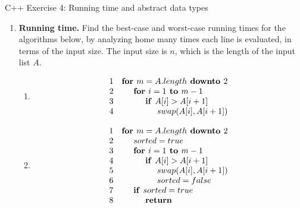 \documentclass[a4paper,12pt]{article}
\begin{document}
\thispagestyle{empty}

\begin{center}
\Large C++ Exercise 4: Running time and abstract data types 
\end{center}

\noindent

\begin{enumerate}

\item \textbf{Running time.} Find the best-case and worst-case running times for the algorithms below, by analyzing home many times each line is evaluated, in terms of the input size. The input size is $n$, which is the length of the input list $A$.
\begin{enumerate}
\item {}
\[
\begin{array}{r l}
1 & \text{\textbf{for\ }}m = A.length \text{\textbf{\ downto\ }}2 \\
2 & \hspace{.5cm} \text{\textbf{for\ }} i = 1 \text{\textbf{\ to\ }} m-1 \\
3 & \hspace{1cm} \text{\textbf{if\ }} A[i] > A[i+1] \\
4 & \hspace{1.5cm} swap(A[i],A[i+1]) 
\end{array}
\]
\item {}
\[
\begin{array}{r l}
1 & \text{\textbf{for\ }}m = A.length \text{\textbf{\ downto\ }}2 \\
2 & \hspace{.5cm} sorted = true \\
3 & \hspace{.5cm} \text{\textbf{for\ }} i = 1 \text{\textbf{\ to\ }} m-1 \\
4 & \hspace{1cm} \text{\textbf{if\ }} A[i] > A[i+1] \\
5 & \hspace{1.5cm} swap(A[i],A[i+1]) \\
6 & \hspace{1.5cm} sorted = false \\
7 & \hspace{.5cm} \text{\textbf{if\ }}sorted = true \\
8 & \hspace{1cm} \text{\textbf{return}} 
\end{array}
\]
\end{enumerate}


\end{enumerate}
\end{document}
